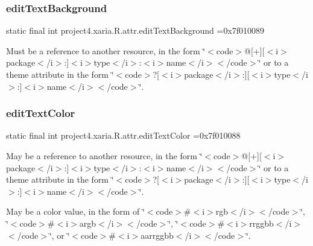 \subsubsection{\texorpdfstring{edit\+Text\+Background}{editTextBackground}}
{\footnotesize\ttfamily static final int project4.\+xaria.\+R.\+attr.\+edit\+Text\+Background =0x7f010089\hspace{0.3cm}{\ttfamily [static]}}

Must be a reference to another resource, in the form \char`\"{}$<$code$>$@\mbox{[}+\mbox{]}\mbox{[}$<$i$>$package$<$/i$>$\+:\mbox{]}$<$i$>$type$<$/i$>$\+:$<$i$>$name$<$/i$>$$<$/code$>$\char`\"{} or to a theme attribute in the form \char`\"{}$<$code$>$?\mbox{[}$<$i$>$package$<$/i$>$\+:\mbox{]}\mbox{[}$<$i$>$type$<$/i$>$\+:\mbox{]}$<$i$>$name$<$/i$>$$<$/code$>$\char`\"{}. \mbox{\label{classproject4_1_1xaria_1_1R_1_1attr_adc78a421870c92acb64dacb5f5fe7106}} 
\subsubsection{\texorpdfstring{edit\+Text\+Color}{editTextColor}}
{\footnotesize\ttfamily static final int project4.\+xaria.\+R.\+attr.\+edit\+Text\+Color =0x7f010088\hspace{0.3cm}{\ttfamily [static]}}

May be a reference to another resource, in the form \char`\"{}$<$code$>$@\mbox{[}+\mbox{]}\mbox{[}$<$i$>$package$<$/i$>$\+:\mbox{]}$<$i$>$type$<$/i$>$\+:$<$i$>$name$<$/i$>$$<$/code$>$\char`\"{} or to a theme attribute in the form \char`\"{}$<$code$>$?\mbox{[}$<$i$>$package$<$/i$>$\+:\mbox{]}\mbox{[}$<$i$>$type$<$/i$>$\+:\mbox{]}$<$i$>$name$<$/i$>$$<$/code$>$\char`\"{}. 

May be a color value, in the form of \char`\"{}$<$code$>$\#$<$i$>$rgb$<$/i$>$$<$/code$>$\char`\"{}, \char`\"{}$<$code$>$\#$<$i$>$argb$<$/i$>$$<$/code$>$\char`\"{}, \char`\"{}$<$code$>$\#$<$i$>$rrggbb$<$/i$>$$<$/code$>$\char`\"{}, or \char`\"{}$<$code$>$\#$<$i$>$aarrggbb$<$/i$>$$<$/code$>$\char`\"{}. \mbox{\label{classproject4_1_1xaria_1_1R_1_1attr_ab7364a1af6c8189428d71b9a28392d8e}} 
